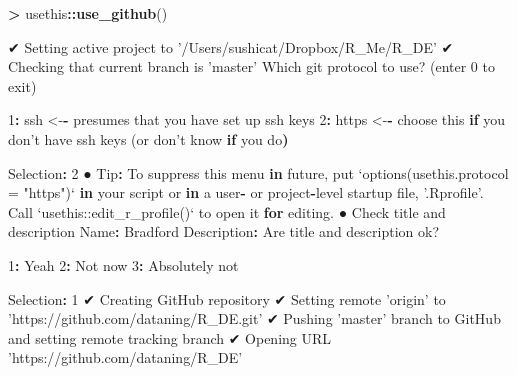 \documentclass[]{book}
\newenvironment{Shaded}{\begin{snugshade}}{\end{snugshade}}
\newcommand{\ControlFlowTok}[1]{\textcolor[rgb]{0.13,0.29,0.53}{\textbf{#1}}}
\newcommand{\DataTypeTok}[1]{\textcolor[rgb]{0.13,0.29,0.53}{#1}}
\newcommand{\DecValTok}[1]{\textcolor[rgb]{0.00,0.00,0.81}{#1}}
\newcommand{\ErrorTok}[1]{\textcolor[rgb]{0.64,0.00,0.00}{\textbf{#1}}}
\newcommand{\KeywordTok}[1]{\textcolor[rgb]{0.13,0.29,0.53}{\textbf{#1}}}
\newcommand{\NormalTok}[1]{#1}
\newcommand{\OperatorTok}[1]{\textcolor[rgb]{0.81,0.36,0.00}{\textbf{#1}}}
\newcommand{\StringTok}[1]{\textcolor[rgb]{0.31,0.60,0.02}{#1}}
\begin{document}
\begin{Shaded}
\begin{Highlighting}[]
\OperatorTok{>}\StringTok{ }\NormalTok{usethis}\OperatorTok{::}\KeywordTok{use_github}\NormalTok{()}

\NormalTok{✔ Setting active project to }\StringTok{'/Users/sushicat/Dropbox/R_Me/R_DE'}
\NormalTok{✔ Checking that current branch is }\StringTok{'master'}
\NormalTok{Which git protocol to use? (enter }\DecValTok{0}\NormalTok{ to exit) }

\DecValTok{1}\OperatorTok{:}\StringTok{ }\NormalTok{ssh   <-}\OperatorTok{-}\StringTok{ }\NormalTok{presumes that you have set up ssh keys}
\DecValTok{2}\OperatorTok{:}\StringTok{ }\NormalTok{https <-}\OperatorTok{-}\StringTok{ }\NormalTok{choose this }\ControlFlowTok{if}\NormalTok{ you don}\StringTok{'t have ssh keys (or don'}\NormalTok{t know }\ControlFlowTok{if}\NormalTok{ you do}\ErrorTok{)}

\NormalTok{Selection}\OperatorTok{:}\StringTok{ }\DecValTok{2}
\NormalTok{● Tip}\OperatorTok{:}\StringTok{ }\NormalTok{To suppress this menu }\ControlFlowTok{in}\NormalTok{ future, put}
  \StringTok{`}\DataTypeTok{options(usethis.protocol = "https")}\StringTok{`}
  \ControlFlowTok{in}\NormalTok{ your script or }\ControlFlowTok{in}\NormalTok{ a user}\OperatorTok{-}\StringTok{ }\NormalTok{or project}\OperatorTok{-}\NormalTok{level startup file, }\StringTok{'.Rprofile'}\NormalTok{.}
\NormalTok{  Call }\StringTok{`}\DataTypeTok{usethis::edit_r_profile()}\StringTok{`}\NormalTok{ to open it }\ControlFlowTok{for}\NormalTok{ editing.}
\NormalTok{● Check title and description}
\NormalTok{  Name}\OperatorTok{:}\StringTok{        }\NormalTok{Bradford}
\NormalTok{  Description}\OperatorTok{:}\StringTok{ }
\NormalTok{Are title and description ok?}

\DecValTok{1}\OperatorTok{:}\StringTok{ }\NormalTok{Yeah}
\DecValTok{2}\OperatorTok{:}\StringTok{ }\NormalTok{Not now}
\DecValTok{3}\OperatorTok{:}\StringTok{ }\NormalTok{Absolutely not}

\NormalTok{Selection}\OperatorTok{:}\StringTok{ }\DecValTok{1}
\NormalTok{✔ Creating GitHub repository}
\NormalTok{✔ Setting remote }\StringTok{'origin'}\NormalTok{ to }\StringTok{'https://github.com/dataning/R_DE.git'}
\NormalTok{✔ Pushing }\StringTok{'master'}\NormalTok{ branch to GitHub and setting remote tracking branch}
\NormalTok{✔ Opening URL }\StringTok{'https://github.com/dataning/R_DE'}
\end{Highlighting}
\end{Shaded}
\end{document}
